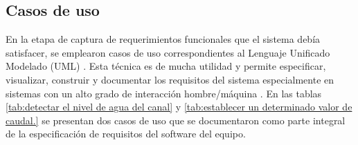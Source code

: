 
\subsection{Casos de uso}
\label{subsec:Casos de uso}
En la etapa de captura de requerimientos funcionales que el sistema debía satisfacer, se emplearon casos de uso correspondientes al Lenguaje Unificado Modelado (UML) \citep{LIBROUML}. Esta técnica es de mucha utilidad y permite especificar, visualizar, construir y documentar los requisitos del sistema especialmente en sistemas con un alto grado de interacción hombre/máquina \citep{PLANTUML}. 
En las tablas \ref{tab:detectar el nivel de agua del canal} y \ref{tab:establecer un determinado valor de caudal.} se presentan dos casos de uso que se documentaron como parte integral de la especificación de requisitos del software del equipo.


